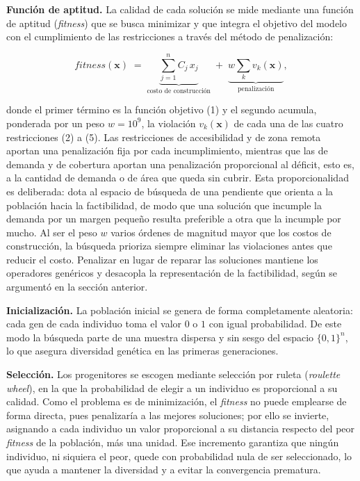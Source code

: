 \documentclass[letter, 10pt]{article}
\begin{document}
\textbf{Función de aptitud.} La calidad de cada solución se mide mediante una función de
aptitud (\emph{fitness}) que se busca minimizar y que integra el objetivo del modelo con el
cumplimiento de las restricciones a través del método de penalización:

\[
\mathit{fitness}(\mathbf{x}) \;=\; \underbrace{\sum_{j=1}^{n} C_j\, x_j}_{\text{costo de construcción}}
\;+\; \underbrace{w \sum_{k} v_k(\mathbf{x})}_{\text{penalización}},
\]

donde el primer término es la función objetivo (1) y el segundo acumula, ponderada por un peso
$w = 10^9$, la violación $v_k(\mathbf{x})$ de cada una de las cuatro restricciones (2) a (5).
Las restricciones de accesibilidad y de zona remota aportan una penalización fija por cada
incumplimiento, mientras que las de demanda y de cobertura aportan una penalización proporcional
al déficit, esto es, a la cantidad de demanda o de área que queda sin cubrir. Esta
proporcionalidad es deliberada: dota al espacio de búsqueda de una pendiente que orienta a la
población hacia la factibilidad, de modo que una solución que incumple la demanda por un margen
pequeño resulta preferible a otra que la incumple por mucho. Al ser el peso $w$ varios órdenes de
magnitud mayor que los costos de construcción, la búsqueda prioriza siempre eliminar las
violaciones antes que reducir el costo. Penalizar en lugar de reparar las soluciones mantiene los
operadores genéricos y desacopla la representación de la factibilidad, según se argumentó en la
sección anterior.

\textbf{Inicialización.} La población inicial se genera de forma completamente aleatoria: cada
gen de cada individuo toma el valor $0$ o $1$ con igual probabilidad. De este modo la búsqueda
parte de una muestra dispersa y sin sesgo del espacio $\{0,1\}^n$, lo que asegura diversidad
genética en las primeras generaciones.

\textbf{Selección.} Los progenitores se escogen mediante selección por ruleta (\emph{roulette
wheel}), en la que la probabilidad de elegir a un individuo es proporcional a su calidad. Como el
problema es de minimización, el \emph{fitness} no puede emplearse de forma directa, pues
penalizaría a las mejores soluciones; por ello se invierte, asignando a cada individuo un valor
proporcional a su distancia respecto del peor \emph{fitness} de la población, más una unidad. Ese
incremento garantiza que ningún individuo, ni siquiera el peor, quede con probabilidad nula de ser
seleccionado, lo que ayuda a mantener la diversidad y a evitar la convergencia prematura.
\end{document}
